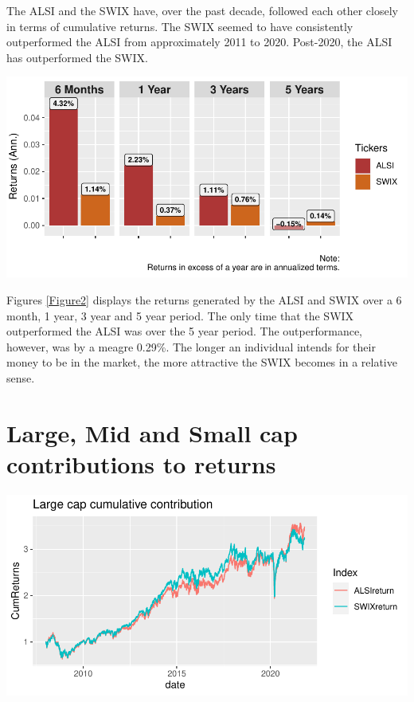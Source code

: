 \documentclass[11pt,preprint, authoryear]{elsarticle}
\let\origfigure\figure
\let\endorigfigure\endfigure
\renewenvironment{figure}[1][2] {
    \expandafter\origfigure\expandafter[H]
} {
    \endorigfigure
}
\numberwithin{equation}{section}
\numberwithin{figure}{section}
\numberwithin{table}{section}
\begin{document}
The ALSI and the SWIX have, over the past decade, followed each other
closely in terms of cumulative returns. The SWIX seemed to have
consistently outperformed the ALSI from approximately 2011 to 2020.
Post-2020, the ALSI has outperformed the SWIX.

\begin{figure}[H]

{\centering \includegraphics{Question3_files/figure-latex/Figure2-1} 

}

\caption{Rolling returns \label{Figure2}}\label{fig:Figure2}
\end{figure}

Figures \ref{Figure2} displays the returns generated by the ALSI and
SWIX over a 6 month, 1 year, 3 year and 5 year period. The only time
that the SWIX outperformed the ALSI was over the 5 year period. The
outperformance, however, was by a meagre 0.29\%. The longer an
individual intends for their money to be in the market, the more
attractive the SWIX becomes in a relative sense.

\hypertarget{large-mid-and-small-cap-contributions-to-returns}{%
\section{Large, Mid and Small cap contributions to
returns}\label{large-mid-and-small-cap-contributions-to-returns}}

\begin{figure}[H]

{\centering \includegraphics{Question3_files/figure-latex/Figure3-1} 

}

\caption{Large caps \label{Figure3}}\label{fig:Figure3}
\end{figure}
\end{document}
